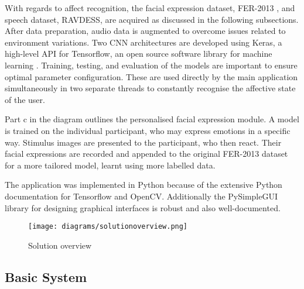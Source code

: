 \documentclass[12pt,a4paper]{article}
\begin{document}
With regards to affect recognition, the facial expression dataset, FER-2013 \cite{Goodfeli-et-al-2013}, and speech dataset, RAVDESS, \cite{livingstone2018ryerson} are acquired as discussed in the following subsections. After data preparation, audio data is augmented to overcome issues related to environment variations. Two CNN architectures are developed using Keras, a high-level API for Tensorflow, an open source software library for machine learning \cite{chollet2015keras}. Training, testing, and evaluation of the models are important to ensure optimal parameter configuration. These are used directly by the main application simultaneously in two separate threads to constantly recognise the affective state of the user. 

Part c in the diagram outlines the personalised facial expression module. A model is trained on the individual participant, who may express emotions in a specific way. Stimulus images are presented to the participant, who then react. Their facial expressions are recorded and appended to the original FER-2013 dataset for a more tailored model, learnt using more labelled data.

The application was implemented in Python because of the extensive Python documentation for Tensorflow and OpenCV. Additionally the PySimpleGUI library for designing graphical interfaces is robust and also well-documented.

\begin{figure}[h]
	\centerline{\texttt{[image: diagrams/solutionoverview.png]}}
	\caption{Solution overview}
\end{figure}

\subsection{Basic System}
\end{document}
